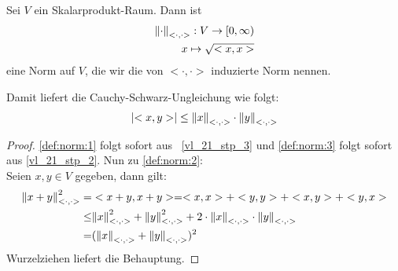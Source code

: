 \begin{Proposition}{%
Sei $V$ ein Skalarprodukt-Raum. Dann ist
\begin{align*}
	\norm{\cdot}_{<\cdot,\cdot>} : V \rightarrow [0,\infty) \\
	x \mapsto \sqrt{<x,x>}
\end{align*}
eine Norm auf $V$, die wir die von $<\cdot,\cdot>$ induzierte Norm nennen.
}\end{Proposition}

\begin{Bemerkung}{
	Damit liefert die Cauchy-Schwarz-Ungleichung wie folgt:
	\begin{align*}
		\abs{<x,y>} \leq \norm{x}_{<\cdot, \cdot>} \cdot \norm{y}_{<\cdot, \cdot>}
	\end{align*}
}\end{Bemerkung}

\begin{proof}
	\ref{def:norm:1} folgt sofort aus ~\ref{vl_21_stp_3} und \ref{def:norm:3} folgt sofort aus 
	\ref{vl_21_stp_2}. Nun zu \ref{def:norm:2}: \\
	Seien $x,y \in V$ gegeben, dann gilt:
	\begin{align*}
		\norm{x + y}^2_{<\cdot,\cdot>} = & <x+y, x+y> =
		<x,x> + <y,y> + <x,y> + <y,x> \\
		\leq & \norm{x}^2_{<\cdot,\cdot>} + \norm{y}^2_{<\cdot,\cdot>} 
		+ 2 \cdot \norm{x}_{<\cdot,\cdot>} \cdot \norm{y}_{<\cdot,\cdot>}\\
		=& (\norm{x}_{<\cdot,\cdot>} + \norm{y}_{<\cdot,\cdot>})^2
	\end{align*}
	Wurzelziehen liefert die Behauptung.
\end{proof}


